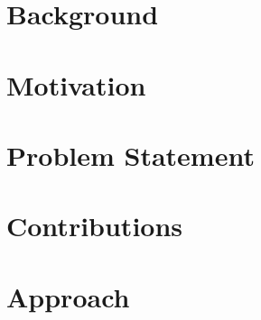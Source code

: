 \documentclass[a4paper,10pt,table,xcdraw]{thesis}
\author{Prasannjeet Singh}
\begin{document}
	\AddToShipoutPicture*{\BackgroundPic}
	\AddToShipoutPicture*{\BackgroundPicLogo}
	\maketitle
	\restoregeometry
	\clearpage
	
	\renewcommand*\contentsname{Table of Contents}
	\tableofcontents %
	\newpage
	
	\setmainfont[
	BoldFont={Charter Bold}, 
	ItalicFont={Charter Italic},
	]{Charter}
	
	\chapter{Background}
	
	\newpage
	
	\chapter{Motivation}
	
	\newpage
	
	\chapter{Problem Statement}
	
	\label{section:ProblemStatement}
	\newpage
	
	\chapter{Contributions}
	
	\newpage
	
	\chapter{Approach}
	
	\newpage
	
\end{document}
